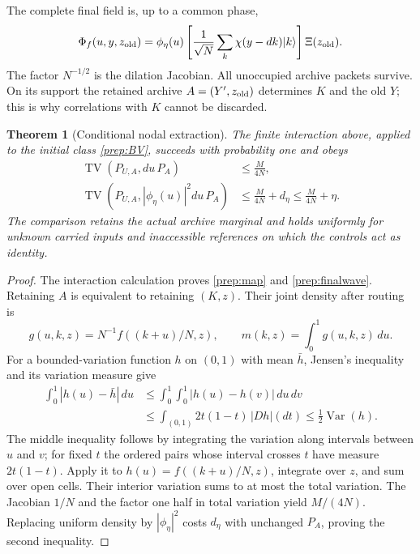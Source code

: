 \documentclass[11pt,oneside,openany]{book}
\newtheorem{theorem}{Theorem}[chapter]
\theoremstyle{definition}
\theoremstyle{remark}\newtheorem{remark}[theorem]{Remark}
\begin{document}
The complete final field is, up to a common phase,
\begin{equation}
 \Phi_f(u,y,z_{\rm old})
   =\phi_\eta(u)\left[
        \frac1{\sqrt N}\sum_k\chi(y-dk)|k\rangle\right]
         \Xi(z_{\rm old}).
 \label{prep:finalwave}
\end{equation}
The factor $N^{-1/2}$ is the dilation Jacobian. All unoccupied archive
packets survive. On its support the retained archive
$A=(Y',z_{\rm old})$ determines $K$ and the old $Y$; this is why correlations
with $K$ cannot be discarded.

\begin{theorem}[Conditional nodal extraction]\label{prep:extractor}
The finite interaction above, applied to the initial class
\eqref{prep:BV}, succeeds with probability one and obeys
\begin{align}
 \operatorname{TV}(P_{U,A},du\,P_A)&\le\frac{M}{4N},\\
 \operatorname{TV}(P_{U,A},|\phi_\eta(u)|^2du\,P_A)
          &\le\frac{M}{4N}+d_\eta
           \le\frac{M}{4N}+\eta.
 \label{prep:extractbound}
\end{align}
The comparison retains the actual archive marginal and holds uniformly
for unknown carried inputs and inaccessible references on which the
controls act as identity.
\end{theorem}
\begin{proof}
The interaction calculation proves \eqref{prep:map} and
\eqref{prep:finalwave}. Retaining $A$ is equivalent to retaining $(K,z)$.
Their joint density after routing is
\[
 g(u,k,z)=N^{-1}f((k+u)/N,z),\qquad
 m(k,z)=\int_0^1g(u,k,z)\,du.
\]
For a bounded-variation function $h$ on $(0,1)$ with mean $\bar h$,
Jensen's inequality and its variation measure give
\begin{align*}
 \int_0^1|h(u)-\bar h|\,du
 &\le\int_0^1\int_0^1|h(u)-h(v)|\,du\,dv\\
 &\le\int_{(0,1)}2t(1-t)\,|Dh|(dt)
 \le\tfrac12\operatorname{Var}(h).
\end{align*}
The middle inequality follows by integrating the variation along intervals
between $u$ and $v$; for fixed $t$ the ordered pairs whose interval crosses
$t$ have measure $2t(1-t)$.
Apply it to $h(u)=f((k+u)/N,z)$, integrate over $z$, and sum over
open cells. Their interior variation sums to at most the total variation.
The Jacobian $1/N$ and the factor one half in total variation yield
$M/(4N)$. Replacing uniform density by $|\phi_\eta|^2$ costs $d_\eta$
with unchanged $P_A$, proving the second inequality.
\end{proof}
\end{document}
